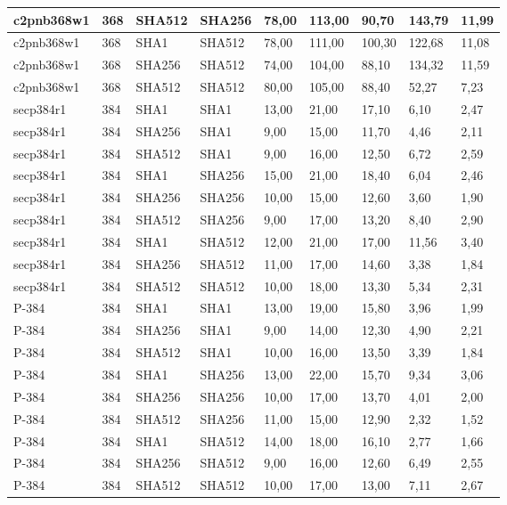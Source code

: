 \begin{longtable}{| l | l | l | l | l |l |l |l |l |}
c2pnb368w1 & 368 & SHA512 & SHA256 & 78,00 & 113,00 & 90,70 & 143,79 & 11,99 \\ \hline 
c2pnb368w1 & 368 & SHA1 & SHA512 & 78,00 & 111,00 & 100,30 & 122,68 & 11,08 \\ \hline 
c2pnb368w1 & 368 & SHA256 & SHA512 & 74,00 & 104,00 & 88,10 & 134,32 & 11,59 \\ \hline 
c2pnb368w1 & 368 & SHA512 & SHA512 & 80,00 & 105,00 & 88,40 & 52,27 & 7,23 \\ \hline 
secp384r1 & 384 & SHA1 & SHA1 & 13,00 & 21,00 & 17,10 & 6,10 & 2,47 \\ \hline 
secp384r1 & 384 & SHA256 & SHA1 & 9,00 & 15,00 & 11,70 & 4,46 & 2,11 \\ \hline 
secp384r1 & 384 & SHA512 & SHA1 & 9,00 & 16,00 & 12,50 & 6,72 & 2,59 \\ \hline 
secp384r1 & 384 & SHA1 & SHA256 & 15,00 & 21,00 & 18,40 & 6,04 & 2,46 \\ \hline 
secp384r1 & 384 & SHA256 & SHA256 & 10,00 & 15,00 & 12,60 & 3,60 & 1,90 \\ \hline 
secp384r1 & 384 & SHA512 & SHA256 & 9,00 & 17,00 & 13,20 & 8,40 & 2,90 \\ \hline 
secp384r1 & 384 & SHA1 & SHA512 & 12,00 & 21,00 & 17,00 & 11,56 & 3,40 \\ \hline 
secp384r1 & 384 & SHA256 & SHA512 & 11,00 & 17,00 & 14,60 & 3,38 & 1,84 \\ \hline 
secp384r1 & 384 & SHA512 & SHA512 & 10,00 & 18,00 & 13,30 & 5,34 & 2,31 \\ \hline 
P-384 & 384 & SHA1 & SHA1 & 13,00 & 19,00 & 15,80 & 3,96 & 1,99 \\ \hline 
P-384 & 384 & SHA256 & SHA1 & 9,00 & 14,00 & 12,30 & 4,90 & 2,21 \\ \hline 
P-384 & 384 & SHA512 & SHA1 & 10,00 & 16,00 & 13,50 & 3,39 & 1,84 \\ \hline 
P-384 & 384 & SHA1 & SHA256 & 13,00 & 22,00 & 15,70 & 9,34 & 3,06 \\ \hline 
P-384 & 384 & SHA256 & SHA256 & 10,00 & 17,00 & 13,70 & 4,01 & 2,00 \\ \hline 
P-384 & 384 & SHA512 & SHA256 & 11,00 & 15,00 & 12,90 & 2,32 & 1,52 \\ \hline 
P-384 & 384 & SHA1 & SHA512 & 14,00 & 18,00 & 16,10 & 2,77 & 1,66 \\ \hline 
P-384 & 384 & SHA256 & SHA512 & 9,00 & 16,00 & 12,60 & 6,49 & 2,55 \\ \hline 
P-384 & 384 & SHA512 & SHA512 & 10,00 & 17,00 & 13,00 & 7,11 & 2,67 \\ \hline 

\end{longtable}
